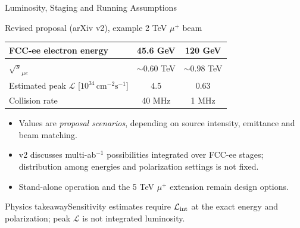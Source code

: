 \documentclass[aspectratio=1610,english]{beamer}
\newcommand{\src}[1]{\vfill{\par\color{black!65}\fontsize{6.4}{7.4}\selectfont\emph{Source:} #1\par}}
\newcommand{\key}[1]{\begin{alertblock}{Physics takeaway}\scriptsize #1\end{alertblock}}
\begin{document}
\begin{frame}[t]{Luminosity, Staging and Running Assumptions}
\footnotesize

\begin{block}{Revised proposal (arXiv v2), example 2 TeV $\mu^+$ beam}
\begin{center}\begin{tabular}{lcc}\toprule
FCC-ee electron energy & 45.6 GeV & 120 GeV\\\midrule
$\sqrt{s}_{\mu e}$ & $\sim0.60$ TeV & $\sim0.98$ TeV\\
Estimated peak $\mathcal L$ [$10^{34}\,\mathrm{cm}^{-2}\mathrm{s}^{-1}$] & $4.5$ & $0.63$\\
Collision rate & 40 MHz & 1 MHz\\\bottomrule
\end{tabular}\end{center}
\end{block}
\begin{itemize}
\justifying
\item Values are \emph{proposal scenarios}, depending on source intensity, emittance and beam matching.
\item v2 discusses multi-ab$^{-1}$ possibilities integrated over FCC-ee stages; distribution among energies and polarization settings is not fixed.
\item Stand-alone operation and the 5 TeV $\mu^+$ extension remain design options.
\end{itemize}
\key{Sensitivity estimates require $\mathcal L_{\rm int}$ at the exact energy and polarization; peak $\mathcal L$ is not integrated luminosity.}

\end{frame}
\end{document}
